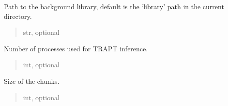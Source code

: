\documentclass[letterpaper,10pt,english]{sphinxmanual}
\begin{document}
\begin{fulllineitems}
\begin{fulllineitems}
\end{fulllineitems}


\begin{fulllineitems}
\label{\detokenize{index:TRAPT.Tools.Args.library}}
\pysigstartsignatures
{}
\pysigstopsignatures
\sphinxAtStartPar
Path to the background library, default is the ‘library’ path in the current directory.
\begin{quote}\begin{description}
\sphinxAtStartPar
str, optional

\end{description}\end{quote}

\end{fulllineitems}


\begin{fulllineitems}
\label{\detokenize{index:TRAPT.Tools.Args.threads}}
\pysigstartsignatures
{}
\pysigstopsignatures
\sphinxAtStartPar
Number of processes used for TRAPT inference.
\begin{quote}\begin{description}
\sphinxAtStartPar
int, optional

\end{description}\end{quote}

\end{fulllineitems}


\begin{fulllineitems}
\label{\detokenize{index:TRAPT.Tools.Args.trunk_size}}
\pysigstartsignatures
{}
\pysigstopsignatures
\sphinxAtStartPar
Size of the chunks.
\begin{quote}\begin{description}
\sphinxAtStartPar
int, optional

\end{description}\end{quote}


\end{fulllineitems}
\end{fulllineitems}
\end{document}
